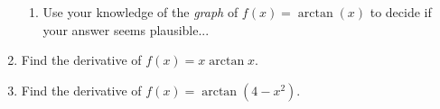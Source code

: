 \documentclass[11pt,fleqn]{article}
\begin{document}
\begin{enumerate}
\begin{enumerate}
	\item Use your knowledge of the \emph{graph} of $f(x)=\arctan(x)$ to decide if your answer seems plausible...
	\vspace{1in}
	\end{enumerate}
\item Find the derivative of $f(x)=x \arctan{x}.$
\vfill	

\item Find the derivative of $f(x) = \arctan ( 4-x^2).$
\vfill
\end{enumerate}
\end{document}
